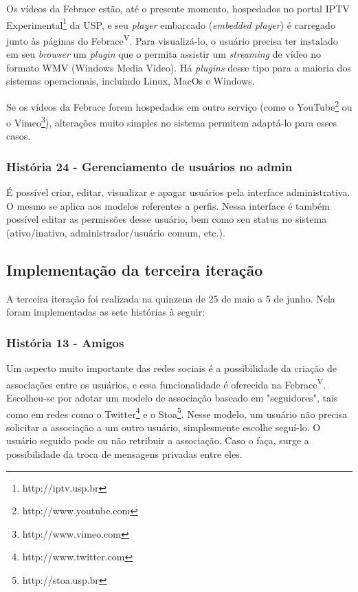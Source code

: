       Os vídeos da Febrace estão, até o presente momento, hospedados no portal IPTV Experimental\footnote{http://iptv.usp.br} da USP, e seu \textit{player} embarcado (\textit{embedded player}) é carregado junto às páginas do Febrace\textsuperscript{V}. Para visualizá-lo, o usuário precisa ter instalado em seu \textit{browser} um \textit{plugin} que o permita assistir um \textit{streaming} de vídeo no formato WMV (Windows Media Video). Há \textit{plugins} desse tipo para a maioria dos sistemas operacionais, incluindo Linux, MacOs e Windows.

      Se os vídeos da Febrace forem hospedados em outro serviço (como o YouTube\footnote{http://www.youtube.com} ou o Vimeo\footnote{http://www.vimeo.com}), alterações muito simples no sistema permitem adaptá-lo para esses casos.

    \subsubsection{História 24 - Gerenciamento de usuários no admin}
      É possível criar, editar, visualizar e apagar usuários pela interface administrativa. O mesmo se aplica aos modelos referentes a perfis. Nessa interface é também possível editar as permissões desse usuário, bem como seu status no sistema (ativo/inativo, administrador/usuário comum, etc.).

  \subsection{Implementação da terceira iteração}
    A terceira iteração foi realizada na quinzena de 25 de maio a 5 de junho. Nela foram implementadas as sete histórias à seguir:

    \subsubsection{História 13 - Amigos}
      Um aspecto muito importante das redes sociais é a possibilidade da criação de associações entre os usuários, e essa funcionalidade é oferecida na Febrace\textsuperscript{V}. Escolheu-se por adotar um modelo de associação baseado em "seguidores", tais como em redes como o Twitter\footnote{http://www.twitter.com} e o Stoa\footnote{http://stoa.usp.br}. Nesse modelo, um usuário não precisa solicitar a associação a um outro usuário, simplesmente escolhe seguí-lo. O usuário seguido pode ou não retribuir a associação. Caso o faça, surge a possibilidade da troca de mensagens privadas entre eles.

